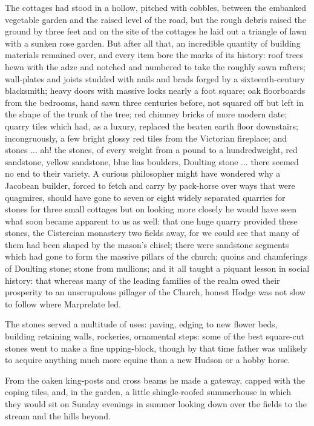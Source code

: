 The cottages had stood in a hollow, pitched with cobbles, between the embanked vegetable garden and the raised level of the road, but the rough debris raised the ground by three feet and on the site of the cottages he laid out a triangle of lawn with a sunken rose garden. But after all that, an incredible quantity of building materials remained over, and every item bore the marks of its history: roof trees hewn with the adze and notched and numbered to take the roughly sawn rafters; wall-plates and joists studded with nails and brads forged by a sixteenth-century blacksmith; heavy doors with massive locks nearly a foot square; oak floorboards from the bedrooms, hand sawn three centuries before, not squared off but left in the shape of the trunk of the tree; red chimney bricks of more modern date; quarry tiles which had, as a luxury, replaced the beaten earth floor downstairs; incongruously, a few bright glossy red tiles from the Victorian fireplace; and stones ... ah! the stones, of every weight from a pound to a hundredweight, red sandstone, yellow sandstone, blue lias boulders, Doulting stone ... there seemed no end to their variety. A curious philosopher might have wondered why a Jacobean builder, forced to fetch and carry by pack-horse over ways that were quagmires, should have gone to seven or eight widely separated quarries for stones for three small cottages but on looking more closely he would have seen what soon became apparent to us as well: that one huge quarry provided these stones, the Cistercian monastery two fields away, for we could see that many of them had been shaped by the mason's chisel; there were sandstone segments which had gone to form the massive pillars of the church; quoins and chamferings of Doulting stone; stone from mullions; and it all taught a piquant lesson in social history: that whereas many of the leading families of the realm owed their prosperity to an unscrupulous pillager of the Church, honest Hodge was not slow to follow where Marprelate led.

The stones served a multitude of uses: paving, edging to new flower beds, building retaining walls, rockeries, ornamental steps: some of the best square-cut stones went to make a fine upping-block, though by that time father was unlikely to acquire anything much more equine than a new Hudson or a hobby horse.

From the oaken king-posts and cross beams he made a gateway, capped with the coping tiles, and, in the garden, a little shingle-roofed summerhouse in which they would sit on Sunday evenings in summer looking down over the fields to the stream and the hills beyond.


